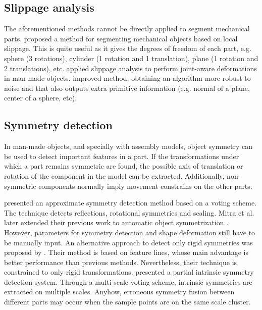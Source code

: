 \subsection{Slippage analysis}
\label{SlippageAnalysis}

The aforementioned methods cannot be directly applied to segment mechanical parts.
\cite{Gelfand2004} proposed a method for segmenting mechanical objects based on local slippage.
This is quite useful as it gives the degrees of freedom of each part, e.g. sphere (3 rotations), cylinder (1 rotation and 1 translation), plane (1 rotation and 2 translations), etc.
\cite{Xu2009} applied slippage analysis to perform joint-aware deformations in man-made objects.
\cite{Yi2014} improved \cite{Gelfand2004} method, obtaining an algorithm more robust to noise and that also outputs extra primitive information (e.g. normal of a plane, center of a sphere, etc).

\subsection{Symmetry detection}
\label{sec:symmetryDetection}

In man-made objects, and specially with assembly models, object symmetry can be used to detect important features in a part.
If the transformations under which a part remains symmetric are found, the possible axis of translation or rotation of the component in the model can be extracted.
Additionally, non-symmetric components normally imply movement constrains on the other parts.

\cite{Mitra2006} presented an approximate symmetry detection method based on a voting scheme.
The technique detects reflections, rotational symmetries and scaling.
Mitra et al. later extended their previous work to automatic object symmetrization \cite{Mitra2007}.
However, parameters for symmetry detection and shape deformation still have to be manually input.
An alternative approach to detect only rigid symmetries was proposed by \cite{Bokeloh2009}.
Their method is based on feature lines, whose main advantage is better performance than previous methods.
Nevertheless, their technique is constrained to only rigid transformations.
\cite{Xu2012} presented a partial intrinsic symmetry detection system.
Through a multi-scale voting scheme, intrinsic symmetries are extracted on multiple scales.
Anyhow, erroneous symmetry fusion between different parts may occur when the sample points are on the same scale cluster. 

